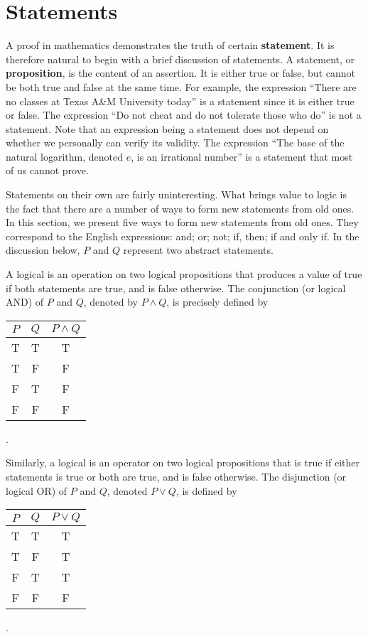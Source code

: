 \section{Statements}

A proof in mathematics demonstrates the truth of certain \textbf{statement}.
It is therefore natural to begin with a brief discussion of statements.
A statement, or \textbf{proposition}, is the content of an assertion.
It is either true or false, but cannot be both true and false at the same time.
For example, the expression ``There are no classes at Texas A\&M University today'' is a statement since it is either true or false.
The expression ``Do not cheat and do not tolerate those who do'' is not a statement.
Note that an expression being a statement does not depend on whether we personally can verify its validity.
The expression ``The base of the natural logarithm, denoted $e$, is an irrational number'' is a statement that most of us cannot prove.

Statements on their own are fairly uninteresting.
What brings value to logic is the fact that there are a number of ways to form new statements from old ones.
In this section, we present five ways to form new statements from old ones.
They correspond to the English expressions: and; or; not; if, then; if and only if.
In the discussion below, $P$ and $Q$ represent two abstract statements.

A logical  is an operation on two logical propositions that produces a value of true if both statements are true, and is false otherwise.
The conjunction (or logical AND) of $P$ and $Q$, denoted by $P \wedge Q$, is precisely defined by
\begin{center}
\begin{tabular}{|c|c|c|}
\hline
$P$ & $Q$ & $P \wedge Q$ \\
\hline
T & T & T \\
T & F & F \\
F & T & F \\
F & F & F \\
\hline
\end{tabular} .
\end{center}

Similarly, a logical  is an operator on two logical propositions that is true if either statements is true or both are true, and is false otherwise.
The disjunction (or logical OR) of $P$ and $Q$, denoted $P \vee Q$, is defined by
\begin{center}
\begin{tabular}{|c|c|c|}
\hline
$P$ & $Q$ & $P \vee Q$ \\
\hline
T & T & T \\
T & F & T \\
F & T & T \\
F & F & F \\
\hline
\end{tabular} .
\end{center}

